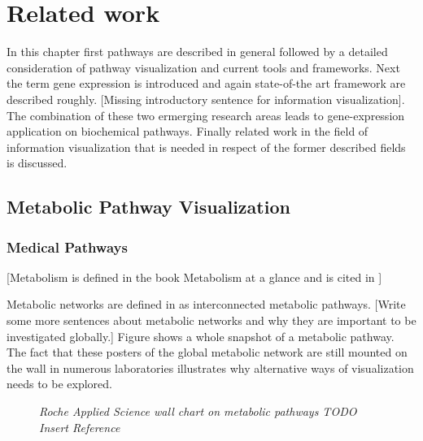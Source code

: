 \chapter{Related work}

In this chapter first pathways are described in general followed by a detailed consideration of pathway visualization and current tools and frameworks. Next the term gene expression is introduced and again state-of-the art framework are described roughly. [Missing introductory sentence for information visualization]. The combination of these two ermerging research areas leads to gene-expression application on biochemical pathways. Finally related work in the field of information visualization that is needed in respect of the former described fields is discussed.

\section{Metabolic Pathway Visualization}

\subsection{Medical Pathways}

[Metabolism is defined in the book Metabolism at a glance and is cited in \citep{Bourqui2006}]

Metabolic networks are defined in \citep{Bourqui2006} as interconnected metabolic pathways.
[Write some more sentences about metabolic networks and why they are important to be investigated globally.]
Figure  shows a whole snapshot of a metabolic pathway. The fact that these posters of the global metabolic network are still mounted on the wall in numerous laboratories illustrates why alternative ways of visualization needs to be explored. 

\begin{figure}[ht]
\centering
{} 
\caption[Roche Applied Science wall chart on metabolic pathways]{\textit{Roche Applied Science wall chart on metabolic pathways TODO Insert Reference}} 
\label{gfx:RocheAppliedScience_MetabolicPathways_WallChart}
\end{figure}

